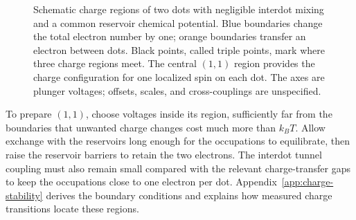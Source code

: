 \begin{figure}[htbp]
 \centering
 
 \caption{Schematic charge regions of two dots with negligible
 interdot mixing and a common reservoir chemical potential.
 Blue boundaries change the total electron number by one;
 orange boundaries transfer an electron between dots.
 Black points, called triple points, mark where three charge regions
 meet. The central $(1,1)$ region provides the charge configuration
 for one localized spin on each dot. The axes are plunger voltages;
 offsets, scales, and cross-couplings are unspecified.}
 \label{fig:measurement-honeycomb}
\end{figure}

To prepare $(1,1)$, choose voltages inside its region, sufficiently
far from the boundaries that unwanted charge changes cost much more
than $k_BT$. Allow exchange with the reservoirs long enough for the
occupations to equilibrate, then raise the reservoir barriers to
retain the two electrons. The interdot tunnel coupling must also
remain small compared with the relevant charge-transfer gaps to
keep the occupations close to one electron per dot. Appendix~\ref{app:charge-stability}
derives the boundary conditions and explains how measured charge
transitions locate these regions.

